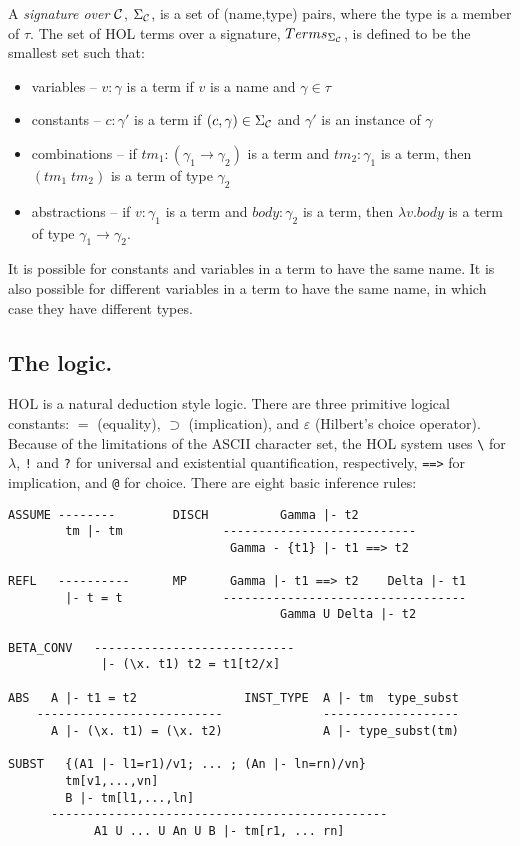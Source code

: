 A {\em signature over ${\cal C}$}, $\Sigma_{\cal C}$, is a set of (name,type)
pairs, where the type is a member of $\tau$. The set of HOL terms over a
signature, $Terms_{\Sigma_{{\cal C}}}$, is defined to be the smallest set such
that:
\begin{itemize}
\item variables -- $v:\gamma$ is a term if $v$ is a name and $\gamma \in \tau$
\item constants -- $c:\gamma'$ is a term if $(c,\gamma) \in \Sigma_{\cal C}$ and 
$\gamma'$ is an instance of $\gamma$
\item combinations -- if $tm_1:(\gamma_1 \rightarrow \gamma_2)$ is a term and
$tm_2:\gamma_1$ is a term, then $(tm_1 \;tm_2)$ is a term of type $\gamma_2$
\item abstractions -- if $v:\gamma_1$ is a term and $body:\gamma_2$ is a term, then $\lambda v.
body$ is a term of type $\gamma_1 \rightarrow \gamma_2$.
\end{itemize}

It is possible for constants and variables in a term to have the same name. It
is also possible for different variables in a term to have the same name, in
which case they have different types.

\subsection{The logic.}

HOL is a natural deduction style logic. There are three primitive logical
constants: $=$ (equality), $\supset$ (implication), and $\varepsilon$
(Hilbert's choice operator). Because of the limitations of the ASCII character
set, the HOL system uses \verb+\+ for $\lambda$, \verb+!+ and \verb+?+ for universal and
existential quantification, respectively, \verb+==>+ for implication, and \verb+@+
for choice. There are eight basic inference rules:
\begin{verbatim}
ASSUME --------        DISCH          Gamma |- t2
        tm |- tm              ---------------------------
                               Gamma - {t1} |- t1 ==> t2

REFL   ----------      MP      Gamma |- t1 ==> t2    Delta |- t1
        |- t = t              ----------------------------------
                                      Gamma U Delta |- t2

BETA_CONV   ----------------------------
             |- (\x. t1) t2 = t1[t2/x]

ABS   A |- t1 = t2               INST_TYPE  A |- tm  type_subst
    --------------------------              -------------------
      A |- (\x. t1) = (\x. t2)              A |- type_subst(tm)

SUBST   {(A1 |- l1=r1)/v1; ... ; (An |- ln=rn)/vn} 
        tm[v1,...,vn]
        B |- tm[l1,...,ln]
      -----------------------------------------------
            A1 U ... U An U B |- tm[r1, ... rn]
\end{verbatim}


